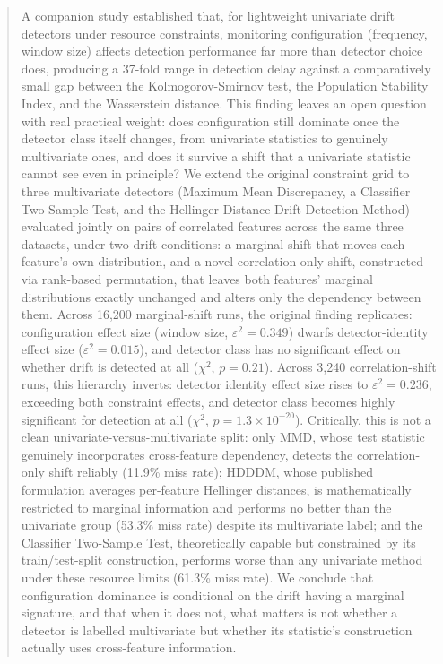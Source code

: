 \documentclass[conference]{IEEEtran}
\begin{document}
\begin{abstract}
A companion study established that, for lightweight univariate drift detectors under resource constraints, monitoring configuration (frequency, window size) affects detection performance far more than detector choice does, producing a 37-fold range in detection delay against a comparatively small gap between the Kolmogorov-Smirnov test, the Population Stability Index, and the Wasserstein distance. This finding leaves an open question with real practical weight: does configuration still dominate once the detector class itself changes, from univariate statistics to genuinely multivariate ones, and does it survive a shift that a univariate statistic cannot see even in principle? We extend the original constraint grid to three multivariate detectors (Maximum Mean Discrepancy, a Classifier Two-Sample Test, and the Hellinger Distance Drift Detection Method) evaluated jointly on pairs of correlated features across the same three datasets, under two drift conditions: a marginal shift that moves each feature's own distribution, and a novel correlation-only shift, constructed via rank-based permutation, that leaves both features' marginal distributions exactly unchanged and alters only the dependency between them. Across 16,200 marginal-shift runs, the original finding replicates: configuration effect size (window size, $\varepsilon^2 = 0.349$) dwarfs detector-identity effect size ($\varepsilon^2 = 0.015$), and detector class has no significant effect on whether drift is detected at all ($\chi^2$, $p = 0.21$). Across 3,240 correlation-shift runs, this hierarchy inverts: detector identity effect size rises to $\varepsilon^2 = 0.236$, exceeding both constraint effects, and detector class becomes highly significant for detection at all ($\chi^2$, $p = 1.3 \times 10^{-20}$). Critically, this is not a clean univariate-versus-multivariate split: only MMD, whose test statistic genuinely incorporates cross-feature dependency, detects the correlation-only shift reliably (11.9\% miss rate); HDDDM, whose published formulation averages per-feature Hellinger distances, is mathematically restricted to marginal information and performs no better than the univariate group (53.3\% miss rate) despite its multivariate label; and the Classifier Two-Sample Test, theoretically capable but constrained by its train/test-split construction, performs worse than any univariate method under these resource limits (61.3\% miss rate). We conclude that configuration dominance is conditional on the drift having a marginal signature, and that when it does not, what matters is not whether a detector is labelled multivariate but whether its statistic's construction actually uses cross-feature information.
\end{abstract}
\end{document}
